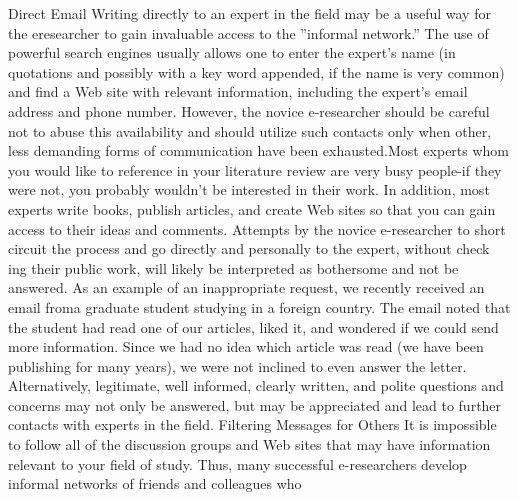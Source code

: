 \documentclass{beamer}
\begin{document}
\begin{frame}{Direct Email}
Writing directly to an expert in the field may be a useful way for the eresearcher
to gain invaluable access to the ”informal network.” The use of
powerful search engines usually allows one to enter the expert’s name (in
quotations and possibly with a key word appended, if the name is very
common) and find a Web site with relevant information, including the expert’s
email address and phone number. However, the novice e-researcher
should be careful not to abuse this availability and should utilize such contacts
only when other, less demanding forms of communication have been
exhausted.Most experts whom you would like to reference in your literature
review are very busy people-if they were not, you probably wouldn’t
be interested in their work. In addition, most experts write books, publish
articles, and create Web sites so that you can gain access to their ideas and
comments. Attempts by the novice e-researcher to short circuit the process
and go directly and personally to the expert, without check ing their public
work, will likely be interpreted as bothersome and not be answered.
As an example of an inappropriate request, we recently received an
email froma graduate student studying in a foreign country. The email
noted that the student had read one of our articles, liked it, and wondered
if we could send more information. Since we had no idea which article was
read (we have been publishing for many years), we were not inclined to even
answer the letter. Alternatively, legitimate, well informed, clearly written,
and polite questions and concerns may not only be answered, but may be
appreciated and lead to further contacts with experts in the field.
Filtering Messages for Others
It is impossible to follow all of the discussion groups and Web sites that
may have information relevant to your field of study. Thus, many successful
e-researchers develop informal networks of friends and colleagues who

\end{frame}
\end{document}
